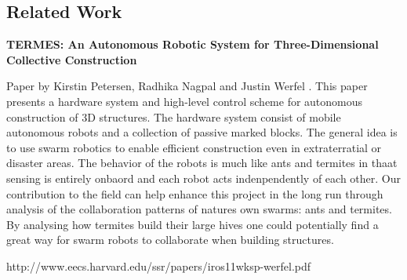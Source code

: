 
\subsection{Related Work}

\noindent \textbf{TERMES: An Autonomous Robotic System for Three-Dimensional Collective Construction} \par

Paper by Kirstin Petersen, Radhika Nagpal and Justin Werfel \cite{termes1}. This paper presents a hardware system and high-level control scheme for autonomous construction of 3D structures. The hardware system consist of mobile autonomous robots and a collection of passive marked blocks. The general idea is to use swarm robotics to enable efficient construction even in extraterratial or disaster areas. The behavior of the robots is much like ants and termites in thaat sensing is entirely onbaord and each robot acts indenpendently of each other. Our contribution to the field can help enhance this project in the long run through analysis of the collaboration patterns of natures own swarms: ants and termites. By analysing how termites build their large hives one could potentially find a great way for swarm robots to collaborate when building structures.

http://www.eecs.harvard.edu/ssr/papers/iros11wksp-werfel.pdf


